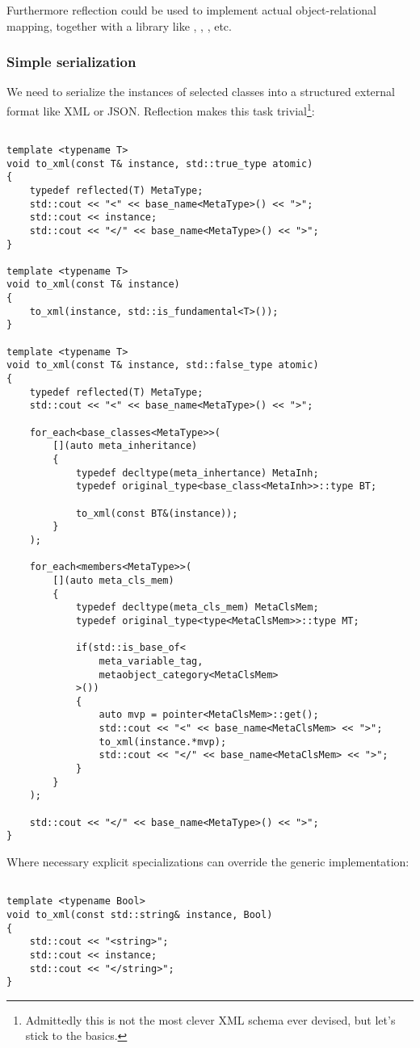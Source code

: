 Furthermore reflection could be used to implement actual object-relational mapping,
together with a library like \verb@SOCI@, \verb@ODBC@, \verb@libpq@, etc.

\subsubsection{Simple serialization}

We need to serialize the instances of selected classes into a structured external format
like XML or JSON. Reflection makes this task trivial\footnote{
Admittedly this is not the most clever XML schema ever devised, but let's stick to the basics.}:

\begin{verbatim}

template <typename T>
void to_xml(const T& instance, std::true_type atomic)
{
	typedef reflected(T) MetaType;
	std::cout << "<" << base_name<MetaType>() << ">";
	std::cout << instance;
	std::cout << "</" << base_name<MetaType>() << ">";
}

template <typename T>
void to_xml(const T& instance)
{
	to_xml(instance, std::is_fundamental<T>());
}

template <typename T>
void to_xml(const T& instance, std::false_type atomic)
{
	typedef reflected(T) MetaType;
	std::cout << "<" << base_name<MetaType>() << ">";

	for_each<base_classes<MetaType>>(
		[](auto meta_inheritance)
		{
			typedef decltype(meta_inhertance) MetaInh;
			typedef original_type<base_class<MetaInh>>::type BT;

			to_xml(const BT&(instance));
		}
	);

	for_each<members<MetaType>>(
		[](auto meta_cls_mem)
		{
			typedef decltype(meta_cls_mem) MetaClsMem;
			typedef original_type<type<MetaClsMem>>::type MT;

			if(std::is_base_of<
				meta_variable_tag,
				metaobject_category<MetaClsMem>
			>())
			{
				auto mvp = pointer<MetaClsMem>::get();
				std::cout << "<" << base_name<MetaClsMem> << ">";
				to_xml(instance.*mvp);
				std::cout << "</" << base_name<MetaClsMem> << ">";
			}
		}
	);

	std::cout << "</" << base_name<MetaType>() << ">";
}

\end{verbatim}

Where necessary explicit specializations can override the generic implementation:

\begin{verbatim}

template <typename Bool>
void to_xml(const std::string& instance, Bool)
{
	std::cout << "<string>";
	std::cout << instance;
	std::cout << "</string>";
}

\end{verbatim}

